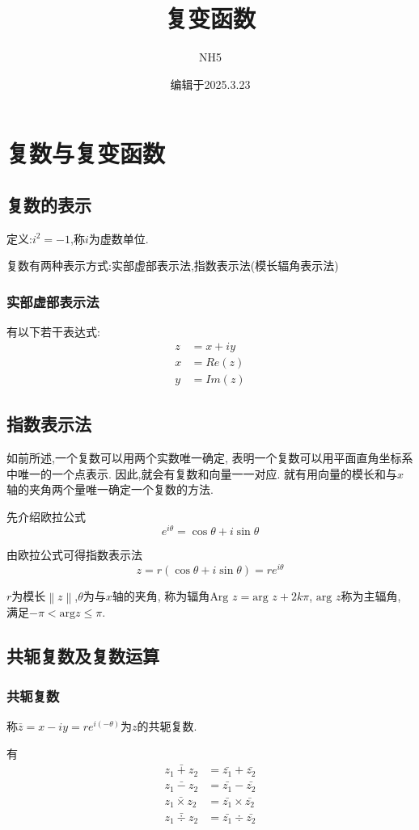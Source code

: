 \documentclass[12pt, a4paper, oneside]{ctexart}
\title{复变函数}
\author{NH5}
\date{编辑于2025.3.23}
\begin{document}
\maketitle
\section{复数与复变函数}
\subsection{复数的表示}
定义:$i^2 = -1$,称$i$为虚数单位.

复数有两种表示方式:实部虚部表示法,指数表示法(模长辐角表示法)
\subsubsection{实部虚部表示法}
有以下若干表达式:
\begin{align*}
    z &= x + iy\\
    x &= Re(z)\\
    y &= Im(z)
\end{align*}
\subsection{指数表示法}
如前所述,一个复数可以用两个实数唯一确定,
表明一个复数可以用平面直角坐标系中唯一的一个点表示.
因此,就会有复数和向量一一对应.
就有用向量的模长和与$x$轴的夹角两个量唯一确定一个复数的方法.

先介绍欧拉公式
\[
    e^{i\theta} = \cos \theta + i \sin \theta
\]

由欧拉公式可得指数表示法
\[
    z = r(\cos \theta + i \sin \theta) = re^{i\theta}
\]

$r$为模长$\left \| z \right \|$,$\theta$为与$x$轴的夹角,
称为辐角$\text{Arg } z = \text{arg }z + 2k\pi$,
$\text{arg }z$称为主辐角,
满足$-\pi < \text{arg} z \le \pi$.
\subsection{共轭复数及复数运算}
\subsubsection{共轭复数}
称$\bar{z} = x - iy = re^{i(-\theta)}$为$z$的共轭复数.

有
\begin{align*}
    \bar{z_1 + z_2} &= \bar{z_1} + \bar{z_2}\\
    \bar{z_1 - z_2} &= \bar{z_1} - \bar{z_2}\\
    \bar{z_1 \times z_2} &= \bar{z_1} \times \bar{z_2}\\
    \bar{z_1 \div z_2} &= \bar{z_1} \div \bar{z_2}
\end{align*}
\end{document}
